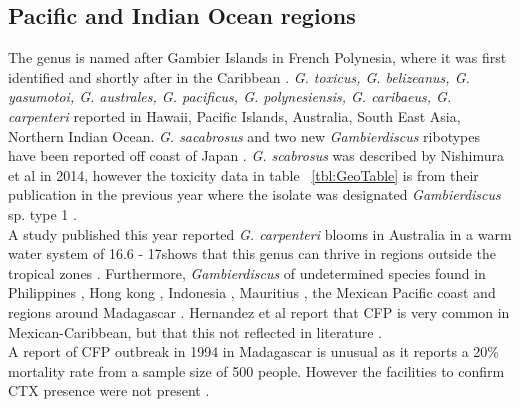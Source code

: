 \documentclass[12pt]{article}
\begin{document}
\subsection{Pacific and Indian Ocean regions}
The genus is named after Gambier Islands in French Polynesia, where it was first identified \cite{adachi1979thecal} and shortly after in the Caribbean \cite{besada1982observations}.
\emph{G. toxicus, G. belizeanus, G. yasumotoi, G. australes, G. pacificus, G. polynesiensis, G. caribaeus, G. carpenteri} reported in Hawaii, Pacific Islands, Australia, South East Asia, Northern Indian Ocean.
\emph{G. sacabrosus} and two new \emph{Gambierdiscus} ribotypes have been reported off coast of Japan \cite{nishimura2013genetic,nishimura2014morphology}. \emph{G. scabrosus} was described by Nishimura et al in 2014, however the toxicity data in table ~\ref{tbl:GeoTable} is from their publication in the previous year where the isolate was designated \emph{Gambierdiscus} sp. type 1 \cite{nishimura2013genetic,nishimura2014morphology}. \\
A study published this year reported \emph{G. carpenteri} blooms in Australia in a warm water system of 16.6 - 17\celsius shows that this genus can thrive in regions outside the tropical zones \cite{kohli2014high}.
Furthermore, \emph{Gambierdiscus} of undetermined species found in Philippines \cite{gillespie1987possible}, Hong kong \cite{lu2004harmful}, Indonesia \cite{praseno1996hab}, Mauritius \cite{hurbungs2002seasonal}, the Mexican Pacific coast \cite{ceballos2006analisis} and regions around Madagascar \cite{grzebyk1994ecology}. Hernandez et al report that CFP is very common in Mexican-Caribbean, but that this not reflected in literature \cite{hernandez2004species}.\\
A report of CFP outbreak in 1994 in Madagascar is unusual as it reports a 20\% mortality rate from a sample size of 500 people. However the facilities to confirm CTX presence were not present \cite{habermehl1994severe}. 
\end{document}
